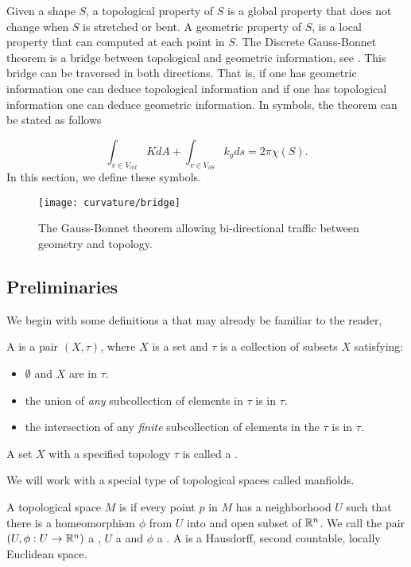 
\label{sec:cast}


Given a shape $S$, a topological property of $S$ is a global property that does
not change when $S$ is stretched or bent.
A geometric property of $S$, is a local property that can computed at each point in $S$.
The Discrete Gauss-Bonnet theorem is a bridge between topological
and geometric information, see . This bridge can be traversed in both directions.
That is, if one has geometric information one can deduce topological information and
if one has topological information one can deduce geometric information.
In symbols, the theorem can be stated as follows

\begin{equation} \label{eqn:g-b}
\int_{v\in V_{int}} K dA + \int_{v\in V_{\partial S}} k_g ds = 2\pi \chi(S).
\end{equation}
In this section, we define these symbols.

\begin{figure}[htb]
\centering
\texttt{[image: curvature/bridge]}
\caption{The Gauss-Bonnet theorem allowing bi-directional traffic
between geometry and topology.}
\label{fig:bridge}
\end{figure}

\subsection{Preliminaries}

We begin with some definitions a that may already be familiar to the reader,
\begin{definition}
A  is a pair $(X,\tau)$, where $X$ is a set and
 $\tau$ is a collection of subsets $X$
satisfying:
	\begin{itemize}
		\item $\emptyset$ and $X$ are in $\tau.$
		\item the union of \emph{any} subcollection of elements in $\tau$ is  in $\tau.$
		\item the intersection of any \emph{finite} subcollection of elements in the $\tau$ is in $\tau.$
	\end{itemize}
A set $X$ with a specified topology $\tau$ is called a .
\end{definition}

We will work with a special type of topological spaces called manfiolds.

\begin{definition}
	A topological space $M$ is 
	if every point $p$ in $M$ has a neighborhood $U$ such that there is  a
	homeomorphism  $\phi$ from $U$ into and open  subset of $\mathbb{R}^n$.
	We call the pair $(U,\phi: U\to \mathbb{R}^n)$ a , $U$ a 
	and  $\phi$ a . 
A  is a Hausdorff, second countable, locally Euclidean space.
\end{definition}

